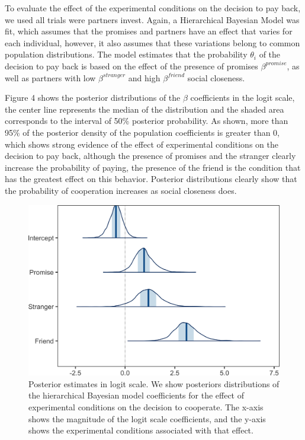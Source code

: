 \documentclass[smallextended]{svjour3}       %
\begin{document}
To evaluate the effect of the experimental conditions on the decision to
pay back, we used all trials were partners invest. Again, a Hierarchical
Bayesian Model was fit, which assumes that the promises and partners
have an effect that varies for each individual, however, it also assumes
that these variations belong to common population distributions. The
model estimates that the probability \(\theta_i\) of the decision to pay
back is based on the effect of the presence of promises
\(\beta^{promise}\), as well as partners with low \(\beta^{stranger}\)
and high \(\beta^{friend}\) social closeness.

Figure 4 shows the posterior distributions of the \(\beta\) coefficients
in the logit scale, the center line represents the median of the
distribution and the shaded area corresponds to the interval of 50\%
posterior probability. As shown, more than 95\% of the posterior density
of the population coefficients is greater than 0, which shows strong
evidence of the effect of experimental conditions on the decision to pay
back, although the presence of promises and the stranger clearly
increase the probability of paying, the presence of the friend is the
condition that has the greatest effect on this behavior. Posterior
distributions clearly show that the probability of cooperation increases
as social closeness does.

\begin{figure}

{\centering \includegraphics[width=0.8\linewidth]{behavioral-promises_files/figure-latex/fig4-1} 

}

\caption{Posterior estimates in logit scale. We show posteriors distributions of the hierarchical Bayesian model coefficients for the effect of experimental conditions on the decision to cooperate. The x-axis shows the magnitude of the logit scale coefficients, and the y-axis shows the experimental conditions associated with that effect.}\label{fig:fig4}
\end{figure}
\end{document}

